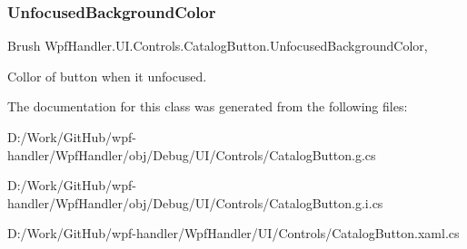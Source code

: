 \subsubsection{\texorpdfstring{Unfocused\+Background\+Color}{UnfocusedBackgroundColor}}
{\footnotesize\ttfamily Brush Wpf\+Handler.\+U\+I.\+Controls.\+Catalog\+Button.\+Unfocused\+Background\+Color\hspace{0.3cm}{\ttfamily [get]}, {\ttfamily [set]}}



Collor of button when it unfocused. 



The documentation for this class was generated from the following files\+:\begin{DoxyCompactItemize}
\item 
D\+:/\+Work/\+Git\+Hub/wpf-\/handler/\+Wpf\+Handler/obj/\+Debug/\+U\+I/\+Controls/Catalog\+Button.\+g.\+cs\item 
D\+:/\+Work/\+Git\+Hub/wpf-\/handler/\+Wpf\+Handler/obj/\+Debug/\+U\+I/\+Controls/Catalog\+Button.\+g.\+i.\+cs\item 
D\+:/\+Work/\+Git\+Hub/wpf-\/handler/\+Wpf\+Handler/\+U\+I/\+Controls/Catalog\+Button.\+xaml.\+cs\end{DoxyCompactItemize}
